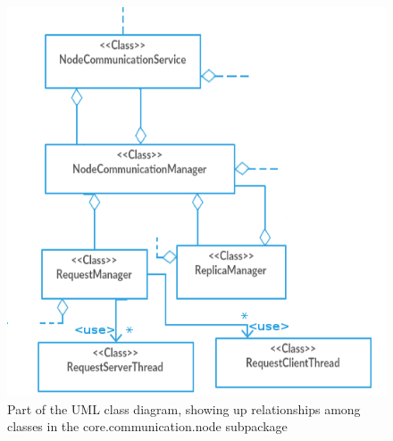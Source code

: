 \documentclass{article}
\begin{document}
\begin{figure}[h]
\centering
\includegraphics[scale=0.35]{core_communication_node}
\caption{Part of the UML class diagram, showing up relationships among classes in the core.communication.node subpackage}
\label{fig:class_diag_core.communication.node	}
\end{figure}
\end{document}
